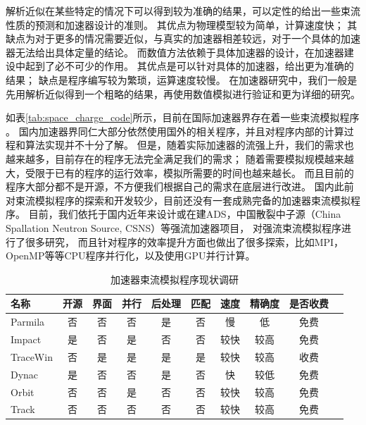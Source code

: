 解析近似在某些特定的情况下可以得到较为准确的结果，可以定性的给出一些束流性质的预测和加速器设计的准则。
其优点为物理模型较为简单，计算速度快；
其缺点为对于更多的情况需要近似，与真实的加速器相差较远，对于一个具体的加速器无法给出具体定量的结论。
而数值方法依赖于具体加速器的设计，在加速器建设中起到了必不可少的作用。
其优点是可以针对具体的加速器，给出更为准确的结果；
缺点是程序编写较为繁琐，运算速度较慢。
在加速器研究中，我们一般是先用解析近似得到一个粗略的结果，再使用数值模拟进行验证和更为详细的研究。

如表\eqref{tab:space_charge_code}所示，目前在国际加速器界存在着一些束流模拟程序
\cite{cern_codeList,ryne1996beam,takeda1998PARMILA,qiang1999impact,uriot2014tracewin,tanke2002dynac,shishlo2006orbit,aseev2005track}。
国内加速器界同仁大部分依然使用国外的相关程序，并且对程序内部的计算过程和算法实现并不十分了解。
但是，随着实际加速器的流强上升，我们的需求也越来越多，目前存在的程序无法完全满足我们的需求；
随着需要模拟规模越来越大，受限于已有的程序的运行效率，模拟所需要的时间也越来越长。
而且目前的程序大部分都不是开源，不方便我们根据自己的需求在底层进行改进。
国内此前对束流模拟程序的探索和开发较少，目前还没有一套成熟完备的加速器束流模拟程序。
目前，我们依托于国内近年来设计或在建ADS，中国散裂中子源（China Spallation Neutron Source, CSNS）等强流加速器项目，
对强流束流模拟程序进行了很多研究，
而且针对程序的效率提升方面也做出了很多探索，比如MPI，OpenMP等等CPU程序并行化，以及使用GPU并行计算。

\begin{table}
  \centering
  \caption{加速器束流模拟程序现状调研}
  \begin{tabular}{|>{\small}l|c|c|c|c|c|c|c|c|c|}
    \hline
    名称	        &开源     &界面       &并行	&后处理     &匹配	&速度 &精确度	 & 是否收费  \\
    \hline
    Parmila  	&否	   &否	   &否	&是	     &否 	&慢	 &低	     & 免费	\\
    Impact  	&是	   &否	   &是	&否	     &否	    &较快 &较高	 & 免费	\\
    TraceWin  	&否	   &是	   &是	&是	     &是	    &较快 &较高	 & 收费	\\
    Dynac  	    &是	   &否	   &否	&是	     &否	    &快     &较低	 & 免费	\\
    Orbit  	    &否	   &否	   &是	&否	     &否	    &较快 &较高	 & 免费	\\
    Track  	    &否	   &否	   &否	&否	     &否 	&较快 &较高	 & 免费	\\
    \hline
  \end{tabular}
  \label{tab:space_charge_code}
\end{table}

